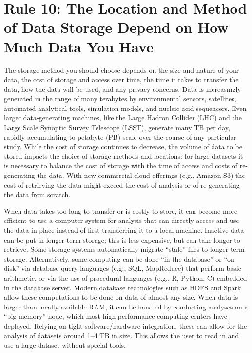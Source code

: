 \documentclass[10pt,letterpaper]{article}
\begin{document}
\section*{Rule 10: The Location and Method of Data Storage Depend on How
Much Data You
Have}\label{rule-10-the-location-and-method-of-data-storage-depend-on-how-much-data-you-have}

The storage method you should choose depends on the size and nature of
your data, the cost of storage and access over time, the time it takes
to transfer the data, how the data will be used, and any privacy
concerns. Data is increasingly generated in the range of many terabytes
by environmental sensors, satellites, automated analytical tools,
simulation models, and nucleic acid sequencers. Even larger
data-generating machines, like the Large Hadron Collider (LHC) and the
Large Scale Synoptic Survey Telescope (LSST), generate many TB per day,
rapidly accumulating to petabyte (PB) scale over the course of any
particular study. While the cost of storage continues to decrease, the
volume of data to be stored impacts the choice of storage methods and
locations: for large datasets it is necessary to balance the cost of
storage with the time of access and costs of re-generating the data.
With new commercial cloud offerings (e.g., Amazon S3) the cost of
retrieving the data might exceed the cost of analysis or of
re-generating the data from scratch.

When data takes too long to transfer or is costly to store, it can
become more efficient to use a computer system for analysis that can
directly access and use the data in place instead of first transferring
it to a local machine. Inactive data can be put in longer-term storage;
this is less expensive, but can take longer to retrieve. Some storage
systems automatically migrate ``stale'' files to longer-term storage.
Alternatively, some computing can be done ``in the database'' or ``on
disk'' via database query languages (e.g., SQL, MapReduce) that perform
basic arithmetic, or via the use of procedural languages (e.g., R,
Python, C) embedded in the database server. Modern database technologies
such as HDFS and Spark allow these computations to be done on data of
almost any size. When data is larger than locally available RAM, it can
be handled by conducting analyses on a ``big memory'' node, which most
high-performance computing centers have deployed. Relying on tight
software/hardware integration, these can allow for the analysis of
datasets around 1--4 TB in size. This allows the user to read in and use
a large dataset without special tools.
\end{document}
